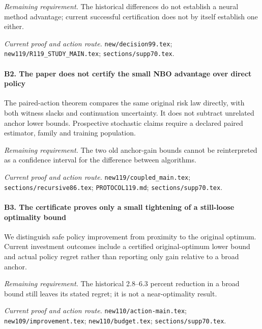 \par\emph{Remaining requirement.} The historical differences do not establish a neural method advantage; current successful certification does not by itself establish one either.

\par\emph{Current proof and action route.} \nolinkurl{new/decision99.tex}; \nolinkurl{new119/R119_STUDY_MAIN.tex}; \nolinkurl{sections/supp70.tex}.

\paragraph{B2. The paper does not certify the small NBO advantage over direct policy}

The paired-action theorem compares the same original risk law directly, with both witness slacks and continuation uncertainty. It does not subtract unrelated anchor lower bounds. Prospective stochastic claims require a declared paired estimator, family and training population.

\par\emph{Remaining requirement.} The two old anchor-gain bounds cannot be reinterpreted as a confidence interval for the difference between algorithms.

\par\emph{Current proof and action route.} \nolinkurl{new119/coupled_main.tex}; \nolinkurl{sections/recursive86.tex}; \nolinkurl{PROTOCOL119.md}; \nolinkurl{sections/supp70.tex}.

\paragraph{B3. The certificate proves only a small tightening of a still-loose optimality bound}

We distinguish safe policy improvement from proximity to the original optimum. Current investment outcomes include a certified original-optimum lower bound and actual policy regret rather than reporting only gain relative to a broad anchor.

\par\emph{Remaining requirement.} The historical 2.8--6.3 percent reduction in a broad bound still leaves its stated regret; it is not a near-optimality result.

\par\emph{Current proof and action route.} \nolinkurl{new110/action-main.tex}; \nolinkurl{new109/improvement.tex}; \nolinkurl{new110/budget.tex}; \nolinkurl{sections/supp70.tex}.

